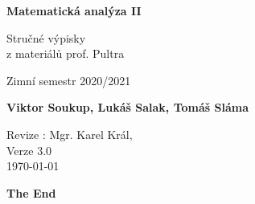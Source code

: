 \documentclass[11pt]{article}
\theoremstyle{nontheoremstyle}
\theoremstyle{nontheoremstylenodot}
\theoremstyle{theoremstyle}
\begin{document}
\begin{titlepage}
    \begin{center}
        \vspace*{1cm}
            
        \Huge
        \textbf{Matematická analýza II}
            
        \vspace{0.5cm}
        \LARGE
        Stručné výpisky
        \\

        z materiálů prof. Pultra

        \vspace{5mm}
        
        Zimní semestr 2020/2021
        
        \vspace{1.5cm}
            
        \textbf{Viktor Soukup, Lukáš Salak, Tomáš Sláma}
        
        \vfill
        \flushright
        \normalsize
        Revize : Mgr. Karel Král,\\
        Verze 3.0\\
        \today
        
    \end{center}
\end{titlepage}

\tableofcontents
\clearpage












\vfill
\begin{center}
\LARGE
\textbf{The End}
\end{center}
\end{document}
